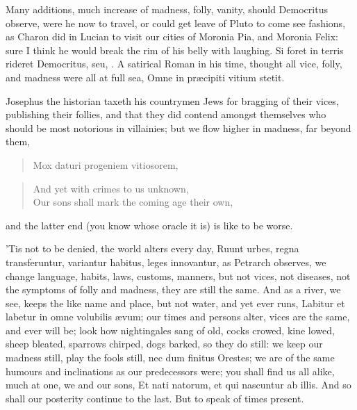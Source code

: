{Many additions, much increase of madness, folly, vanity, should
Democritus observe, were he now to travel, or could get leave of Pluto
to come see fashions, as Charon did in Lucian to visit our cities of
Moronia Pia, and Moronia Felix: sure I think he would break the rim of
his belly with laughing. Si foret in terris rideret Democritus,
seu, \etc{}. A satirical Roman in his time, thought all vice, folly, and
madness were all at full sea, Omne in pr\ae{}cipiti vitium stetit.

Josephus the historian taxeth his countrymen Jews for bragging of
their vices, publishing their follies, and that they did contend
amongst themselves who should be most notorious in villainies; but we
flow higher in madness, far beyond them,
\begin{verse}
Mox daturi progeniem vitiosorem,
\end{verse}

\begin{verse}
And yet with crimes to us unknown, \\
Our sons shall mark the coming age their own, \\
\end{verse}

and the latter end (you know whose oracle it is) is like to be worse.

'Tis not to be denied, the world alters every day, Ruunt urbes, regna
transferuntur, \etc{} variantur habitus, leges innovantur, as
Petrarch observes, we change language, habits, laws, customs,
manners, but not vices, not diseases, not the symptoms of folly and
madness, they are still the same. And as a river, we see, keeps the
like name and place, but not water, and yet ever runs, Labitur et
labetur in omne volubilis \ae{}vum; our times and persons alter, vices are
the same, and ever will be; look how nightingales sang of old, cocks
crowed, kine lowed, sheep bleated, sparrows chirped, dogs barked, so
they do still: we keep our madness still, play the fools still, nec dum
finitus Orestes; we are of the same humours and inclinations as our
predecessors were; you shall find us all alike, much at one, we and our
sons, Et nati natorum, et qui nascuntur ab illis. And so shall our
posterity continue to the last. But to speak of times present.

}
